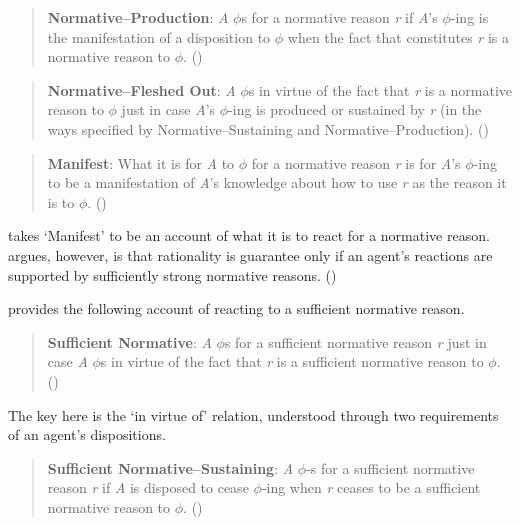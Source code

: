 \documentclass[10pt]{article}
\begin{document}
\begin{quote}
  \textbf{Normative–Production}: \emph{A} \(\phi\)s for a normative reason \emph{r} if \emph{A}'s \(\phi\)-ing is the manifestation of a disposition to \(\phi\) when the fact that constitutes \emph{r} is a normative reason to \(\phi\).\nolinebreak
  \mbox{}\hfill\mbox{(\citeyear[139]{Lord:2018aa})}
\end{quote}

\begin{quote}
  \textbf{Normative–Fleshed Out}: \emph{A} \(\phi\)s in virtue of the fact that \emph{r} is a normative reason to \(\phi\) just in case \emph{A}'s \(\phi\)-ing is produced or sustained by \emph{r} (in the ways specified by Normative–Sustaining and Normative–Production).\nolinebreak
  \mbox{}\hfill\mbox{(\citeyear[139]{Lord:2018aa})}
\end{quote}

\begin{quote}
  \textbf{Manifest}: What it is for \emph{A} to \(\phi\) for a normative reason \emph{r} is for \emph{A}'s \(\phi\)-ing to be a manifestation of \emph{A}'s knowledge about how to use \emph{r} as the reason it is to \(\phi\).\nolinebreak
  \mbox{}\hfill\mbox{(\citeyear[139]{Lord:2018aa})}
\end{quote}

\citeauthor{Lord:2018aa} takes `Manifest' to be an account of what it is to react for a normative reason.
\citeauthor{Lord:2018aa} argues, however, is that rationality is guarantee only if an agent's reactions are supported by sufficiently strong normative reasons.
(\citeyear[141]{Lord:2018aa})

\citeauthor{Lord:2018aa} provides the following account of reacting to a sufficient normative reason.

\begin{quote}
  \textbf{Sufficient Normative}: \emph{A} \(\phi\)s for a sufficient normative reason \emph{r} just in case \emph{A} \(\phi\)s in virtue of the fact that \emph{r} is a sufficient normative reason to \(\phi\).\nolinebreak
  \mbox{}\hfill\mbox{(\citeyear[142]{Lord:2018aa})}
\end{quote}

The key here is the `in virtue of' relation, understood through two requirements of an agent's dispositions.

\begin{quote}
  \textbf{Sufficient Normative–Sustaining}: \emph{A} \(\phi\)-s for a sufficient normative reason \emph{r} if \emph{A} is disposed to cease \(\phi\)-ing when \emph{r} ceases to be a sufficient normative reason to \(\phi\).\nolinebreak
  \mbox{}\hfill\mbox{(\citeyear[142]{Lord:2018aa})}
\end{quote}
\end{document}
